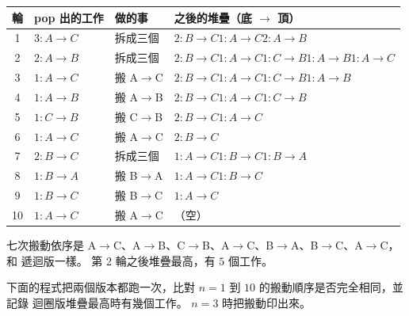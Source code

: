 \begin{center}
\small
\begin{tabular}{clll}
\toprule
輪 & pop 出的工作 & 做的事 & 之後的堆疊（底 $\to$ 頂）\\
\midrule
1 & $3{:}A{\to}C$ & 拆成三個 & $2{:}B{\to}C$\quad $1{:}A{\to}C$\quad $2{:}A{\to}B$ \\
2 & $2{:}A{\to}B$ & 拆成三個 & $2{:}B{\to}C$\quad $1{:}A{\to}C$\quad $1{:}C{\to}B$\quad $1{:}A{\to}B$\quad $1{:}A{\to}C$ \\
3 & $1{:}A{\to}C$ & 搬 A$\to$C & $2{:}B{\to}C$\quad $1{:}A{\to}C$\quad $1{:}C{\to}B$\quad $1{:}A{\to}B$ \\
4 & $1{:}A{\to}B$ & 搬 A$\to$B & $2{:}B{\to}C$\quad $1{:}A{\to}C$\quad $1{:}C{\to}B$ \\
5 & $1{:}C{\to}B$ & 搬 C$\to$B & $2{:}B{\to}C$\quad $1{:}A{\to}C$ \\
6 & $1{:}A{\to}C$ & 搬 A$\to$C & $2{:}B{\to}C$ \\
7 & $2{:}B{\to}C$ & 拆成三個 & $1{:}A{\to}C$\quad $1{:}B{\to}C$\quad $1{:}B{\to}A$ \\
8 & $1{:}B{\to}A$ & 搬 B$\to$A & $1{:}A{\to}C$\quad $1{:}B{\to}C$ \\
9 & $1{:}B{\to}C$ & 搬 B$\to$C & $1{:}A{\to}C$ \\
10 & $1{:}A{\to}C$ & 搬 A$\to$C & （空）\\
\bottomrule
\end{tabular}
\end{center}

七次搬動依序是 A$\to$C、A$\to$B、C$\to$B、A$\to$C、B$\to$A、B$\to$C、A$\to$C，和
遞迴版一樣。 第 2 輪之後堆疊最高，有 $5$ 個工作。

下面的程式把兩個版本都跑一次，比對 $n = 1$ 到 $10$ 的搬動順序是否完全相同，並記錄
迴圈版堆疊最高時有幾個工作。 $n = 3$ 時把搬動印出來。

